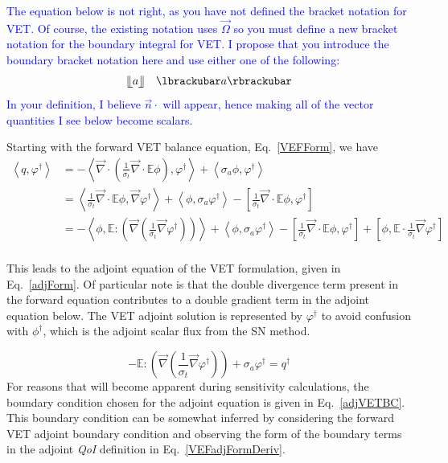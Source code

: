 \documentclass[12pt]{report}
\newcommand{\vO}{\vec{\Omega}}
\newcommand{\bra}{\left\langle}
\newcommand{\ket}{\right\rangle}
\newcommand{\sbra}{\left[}
\newcommand{\sket}{\right]}
\renewcommand{\div}{\vec{\nabla} \cdot}
\newcommand{\grad}{\vec{\nabla}}
\newcommand{\vefadj}{\varphi^\dag}
\newcommand{\vn}{\vec{n}}
\newcommand{\Edd}{\mathbb{E}}
\newcommand{\sigt}{\sigma_t}
\newcommand{\siga}{\sigma_a}
\newcommand{\scalSource}{q}
\newcommand{\scalResp}{q^\dag}
\newcommand{\qoi}{{\it QoI}\xspace}
\newcommand{\comment}[2]{\marginpar{\textcolor{#2}{$\star$}}\textcolor{#2}{#1}\newline}
\newcommand{\jcr}[1]{\comment{#1}{blue}}
\newcommand{\jcr}[1]{\phantom{a}}
\begin{document}
\jcr{
The equation below is not right, as you have not defined the bracket notation for VET. Of course, the existing notation uses $\vO$ so you must define a new bracket notation for the boundary integral for VET. I  propose that you introduce the boundary bracket notation here and use either one of the following:
\[
\llfloor a \rrfloor \quad \lbrackubar a\rbrackubar
\]
In your definition, I believe $\vn \cdot$ will appear, hence making all of the vector quantities I see below become scalars.}

Starting with the forward VET balance equation, Eq.~\eqref{VEFForm}, we have 
\begin{equation}
\label{VEFadjFormDeriv}
\begin{split}
\bra \scalSource , \vefadj \ket &= - \bra \div \left( \frac{1}{\sigt}\div \Edd \phi \right), \vefadj \ket +  \bra \siga \phi, \vefadj \ket   \\
&= \bra \frac{1}{\sigt}\div \Edd \phi, \grad \vefadj \ket  +  \bra  \phi, \siga \vefadj \ket - \sbra \frac{1}{\sigt}\div \Edd \phi, \vefadj \sket   \\
 &=  - \bra \phi, \Edd : \left( \grad \left( \frac{1}{\sigt}\grad \vefadj \right) \right) \ket  +  \bra  \phi, \siga \vefadj \ket - \sbra \frac{1}{\sigt}\div \Edd \phi, \vefadj \sket + \sbra \phi, \Edd \cdot \frac{1}{\sigt} \grad \vefadj \sket \\
\end{split}
\end{equation}


This leads to the adjoint equation of the VET formulation, given in Eq.~\eqref{adjForm}. Of particular note is that the double divergence term present in the forward equation contributes to a double gradient term in the adjoint equation below. The VET adjoint solution is represented by $\vefadj$ to avoid confusion with $\phi^\dag$, which is the adjoint scalar flux from the SN method. 

\begin{equation}
\label{adjForm}
- \Edd : \left( \grad \left( \frac{1}{\sigt}\grad \vefadj \right) \right) + \siga \vefadj = \scalResp
\end{equation}
For reasons that will become apparent during sensitivity calculations, the boundary condition chosen for the adjoint equation is given in Eq.~\eqref{adjVETBC}. This boundary condition can be somewhat inferred by considering the forward VET adjoint boundary condition and observing the form of the boundary terms in the adjoint \qoi definition in Eq.~\eqref{VEFadjFormDeriv}.
\end{document}
